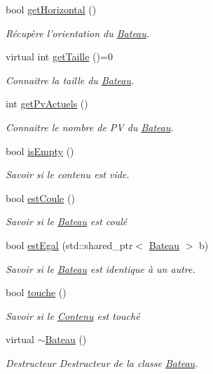 \begin{DoxyCompactItemize}
bool \hyperlink{classBateau_a8578b6073e4f546d4c255e23fbb3c1dc}{get\+Horizontal} ()
\begin{DoxyCompactList}\small\item\em Récupère l'orientation du \hyperlink{classBateau}{Bateau}. \end{DoxyCompactList}\item 
virtual int \hyperlink{classBateau_a08be20b8c871149d717a30b00c1068b9}{get\+Taille} ()=0
\begin{DoxyCompactList}\small\item\em Connaitre la taille du \hyperlink{classBateau}{Bateau}. \end{DoxyCompactList}\item 
int \hyperlink{classBateau_afe0dcf17979772fef6973b5aa5bca46a}{get\+Pv\+Actuels} ()
\begin{DoxyCompactList}\small\item\em Connaitre le nombre de P\+V du \hyperlink{classBateau}{Bateau}. \end{DoxyCompactList}\item 
bool \hyperlink{classBateau_a8a8984f7b1010fbdd4cd15c7768da2ca}{is\+Empty} ()
\begin{DoxyCompactList}\small\item\em Savoir si le contenu est vide. \end{DoxyCompactList}\item 
bool \hyperlink{classBateau_a6e4d8fc7cf8b265592dd009ecac72be2}{est\+Coule} ()
\begin{DoxyCompactList}\small\item\em Savoir si le \hyperlink{classBateau}{Bateau} est coulé \end{DoxyCompactList}\item 
bool \hyperlink{classBateau_a0eaa5c908df108398064be6a8ab20a60}{est\+Egal} (std\+::shared\+\_\+ptr$<$ \hyperlink{classBateau}{Bateau} $>$ b)
\begin{DoxyCompactList}\small\item\em Savoir si le \hyperlink{classBateau}{Bateau} est identique à un autre. \end{DoxyCompactList}\item 
bool \hyperlink{classBateau_a8fff831d5081544b0abbf5b6816ebe35}{touche} ()
\begin{DoxyCompactList}\small\item\em Savoir si le \hyperlink{classContenu}{Contenu} est touché \end{DoxyCompactList}\item 
\hypertarget{classBateau_a8545a0456e618328674c5cdf629e14b5}{virtual \hyperlink{classBateau_a8545a0456e618328674c5cdf629e14b5}{$\sim$\+Bateau} ()}\label{classBateau_a8545a0456e618328674c5cdf629e14b5}

\begin{DoxyCompactList}\small\item\em Destructeur Destructeur de la classe \hyperlink{classBateau}{Bateau}. \end{DoxyCompactList}\end{DoxyCompactItemize}
